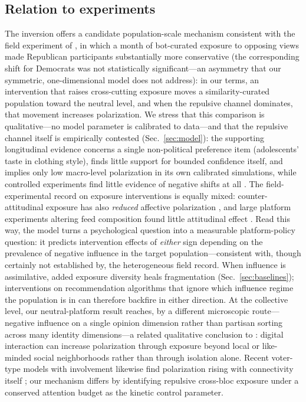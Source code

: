 \documentclass[5p,times,twocolumn]{elsarticle}
\begin{document}
\subsection{Relation to experiments} The inversion offers a candidate
population-scale mechanism consistent with the field experiment of
\citet{bail2018}, in which a month of bot-curated exposure to opposing
views made Republican participants substantially more conservative (the
corresponding shift for Democrats was not statistically significant---an
asymmetry that our symmetric, one-dimensional model does not address): in
our terms, an intervention that raises cross-cutting exposure moves a
similarity-curated population toward the neutral level, and when the
repulsive channel dominates, that movement increases polarization. We
stress that this comparison is qualitative---no model parameter is
calibrated to data---and that the repulsive channel itself is empirically
contested (Sec.~\ref{sec:model}): the supporting longitudinal evidence
\citep{tang2025} concerns a single non-political preference item
(adolescents' taste in clothing style), finds little support for bounded
confidence itself, and implies only low macro-level polarization in its
own calibrated simulations, while controlled experiments find little
evidence of negative shifts at all \citep{takacs2016}. The
field-experimental record on exposure interventions is equally mixed:
counter-attitudinal exposure has also \emph{reduced} affective
polarization \citep{levy2021}, and large platform experiments altering
feed composition found little attitudinal effect \citep{nyhan2023}. Read
this way, the model turns a psychological question into a measurable
platform-policy question: it predicts intervention effects of
\emph{either} sign depending on the prevalence of negative influence in
the target population---consistent with, though certainly not established
by, the heterogeneous field record. When influence is assimilative, added
exposure diversity heals fragmentation (Sec.~\ref{sec:baselines});
interventions on recommendation algorithms that ignore which influence
regime the population is in can therefore backfire in either direction.
At the collective level, our neutral-platform result reaches, by a
different microscopic route---negative influence on a single opinion
dimension rather than partisan sorting across many identity
dimensions---a related qualitative conclusion to \citet{tornberg2022}: digital
interaction can increase polarization through exposure beyond local or
like-minded social neighborhoods rather than through isolation alone. Recent voter-type models with
involvement likewise find polarization rising with connectivity itself
\citep{pham2026}; our mechanism differs by identifying repulsive
cross-bloc exposure under a conserved attention budget as the kinetic
control parameter.
\end{document}
